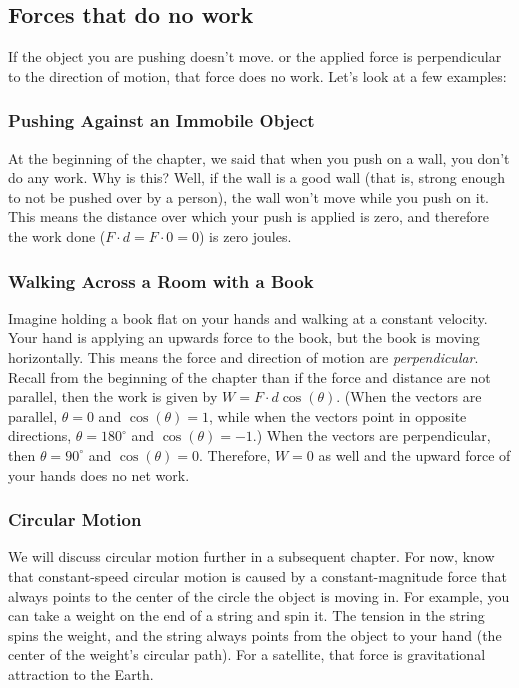 \subsection{Forces that do no work}
If the object you are pushing doesn't move. or the applied force is perpendicular 
to the direction of motion, that force does no work. Let's look at a few examples:

\subsubsection{Pushing Against an Immobile Object}
At the beginning of the chapter, we said that when you push on a wall, you don't 
do any work. Why is this? Well, if the wall is a good wall (that is, strong 
enough to not be pushed over by a person), the wall won't move while you push on 
it. This means the distance over which your push is applied is zero, and 
therefore the work done ($F \cdot d = F \cdot 0 = 0$) is zero joules.

\subsubsection{Walking Across a Room with a Book}
Imagine holding a book flat on your hands and walking at a constant velocity. 
Your hand is applying an upwards force to the book, but the book is moving 
horizontally. This means the force and direction of motion are 
\textit{perpendicular}. Recall from the beginning of the chapter than if the 
force and distance are not parallel, then the work is given by $W = F \cdot d 
\cos{\left( \theta \right)}$. (When the vectors are parallel, $\theta = 0$ and 
$\cos{\left( \theta \right)} = 1$, while when the vectors point in opposite 
directions, $\theta = 180^{\circ}$ and $\cos{ \left( \theta \right)} = -1$.) 
When the vectors are perpendicular, then $\theta = 90^{\circ}$ and $\cos{ \left( 
\theta \right)} = 0$. Therefore, $W = 0$ as well and the upward force of your 
hands does no net work. 

\subsubsection{Circular Motion}
We will discuss circular motion further in a subsequent chapter. For now, know 
that constant-speed circular motion is caused by a constant-magnitude force that 
always points to the center of the circle the object is moving in. For example, 
you can take a weight on the end of a string and spin it. The tension in the 
string spins the weight, and the string always points from the object to your 
hand (the center of the weight's circular path). For a satellite, that force is 
gravitational attraction to the Earth.

